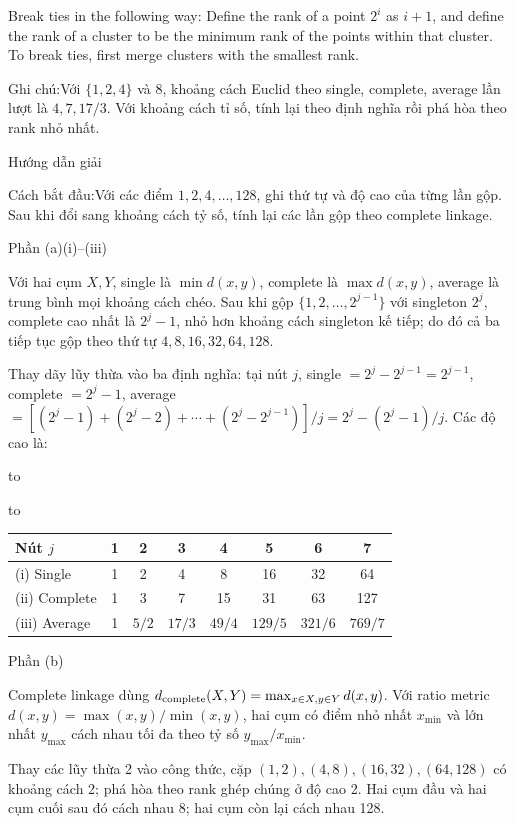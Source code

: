 \documentclass[10pt,a4paper,twocolumn]{article}
\makeatletter
\newcommand{\maptag}[1]{\phantomsection\@bsphack\protected@write\@auxout{}{\string\newlabel{#1}{{}{\thepage}{}{\@currentHref}{}}}\@esphack}
\newcommand{\key}[1]{#1:\enspace}
\newcommand{\solutionprompt}[1]{\par\addvspace{1pt}\noindent\key{Cách bắt đầu}#1\par\addvspace{2pt}}
\newcommand{\examnote}[1]{\par\addvspace{2pt}\noindent\key{Ghi chú}#1\par\addvspace{3pt}}
\newcommand{\blocklabel}[1]{\par\noindent#1\par\nobreak}
\newcommand{\answer}[1]{%
  \par\addvspace{3pt}%
  \blocklabel{#1Hướng dẫn giải}}
\newcommand{\guidepart}[1]{%
  \par\addvspace{1.5pt}%
  \blocklabel{Phần #1}}
\newenvironment{examtable}[1]{%
  \par\addvspace{2pt}\noindent\hbox to \linewidth\bgroup\hfil
  \setlength{\tabcolsep}{4pt}%
  \renewcommand{\arraystretch}{1.12}\begin{tabular}{#1}%
}{\end{tabular}\hfil\egroup\par\addvspace{2pt}}
\newenvironment{diagram}{%
  \par\addvspace{3pt}\noindent\hbox to \linewidth\bgroup\hfil
}{\hfil\egroup\par\addvspace{3pt}}
\makeatother
\begin{document}
Break ties in the following way: Define the rank of a point $2^i$ as $i+1$, and define the rank of a cluster to be the minimum rank of the points within that cluster. To break ties, first merge clusters with the smallest rank.

\examnote{Với $\{1,2,4\}$ và $8$, khoảng cách Euclid theo single, complete, average lần lượt là $4,7,17/3$. Với khoảng cách tỉ số, tính lại theo định nghĩa rồi phá hòa theo rank nhỏ nhất.}
\answer{\maptag{answer:A1-Q3}\maptag{answer:P24-Q3}}
\solutionprompt{Với các điểm $1,2,4,\ldots,128$, ghi thứ tự và độ cao của từng lần gộp. Sau khi đổi sang khoảng cách tỷ số, tính lại các lần gộp theo complete linkage.}
\guidepart{(a)(i)--(iii)}
\begin{guidesteps}
\item Với hai cụm $X,Y$, single là $\min d(x,y)$, complete là $\max d(x,y)$, average là trung bình mọi khoảng cách chéo. Sau khi gộp $\{1,2,\ldots,2^{j-1}\}$ với singleton $2^j$, complete cao nhất là $2^j-1$, nhỏ hơn khoảng cách singleton kế tiếp; do đó cả ba tiếp tục gộp theo thứ tự $4,8,16,32,64,128$.
\item Thay dãy lũy thừa vào ba định nghĩa: tại nút $j$, single $=2^j-2^{j-1}=2^{j-1}$, complete $=2^j-1$, average $=[(2^j-1)+(2^j-2)+\cdots +(2^j-2^{j-1})]/j=2^j-(2^j-1)/j$. Các độ cao là:
\begin{diagram}
\end{diagram}
\begin{examtable}{@{}l c c c c c c c@{}}
\toprule
Nút $j$ & 1 & 2 & 3 & 4 & 5 & 6 & 7 \\
\midrule
(i) Single & 1 & 2 & 4 & 8 & 16 & 32 & 64 \\
(ii) Complete & 1 & 3 & 7 & 15 & 31 & 63 & 127 \\
(iii) Average & 1 & $5/2$ & $17/3$ & $49/4$ & $129/5$ & $321/6$ & $769/7$ \\
\bottomrule
\end{examtable}
\end{guidesteps}
\guidepart{(b)}
\begin{guidesteps}
\item Complete linkage dùng $d_{\rm complete}(X,Y)=\max_{x\in X,y\in Y}d(x,y)$. Với ratio metric $d(x,y)=\max(x,y)/\min(x,y)$, hai cụm có điểm nhỏ nhất $x_{\min}$ và lớn nhất $y_{\max}$ cách nhau tối đa theo tỷ số $y_{\max}/x_{\min}$.
\item Thay các lũy thừa 2 vào công thức, cặp $(1,2),(4,8),(16,32),(64,128)$ có khoảng cách 2; phá hòa theo rank ghép chúng ở độ cao 2. Hai cụm đầu và hai cụm cuối sau đó cách nhau 8; hai cụm còn lại cách nhau 128.
\end{guidesteps}
\end{document}
